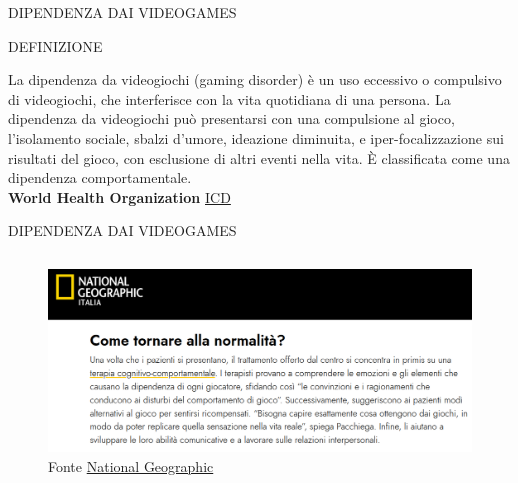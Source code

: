 \documentclass[aspectratio=1610]{beamer}
\begin{document}
\begin{frame}{DIPENDENZA DAI VIDEOGAMES}
    \begin{alertblock}{DEFINIZIONE}
        \begin{minipage}{0.98\linewidth}
            \justifying
            La dipendenza da videogiochi (gaming disorder) è un uso eccessivo o compulsivo di videogiochi, 
            che interferisce con la vita quotidiana di una persona. La dipendenza da videogiochi può presentarsi 
            con una compulsione al gioco, l'isolamento sociale, sbalzi d'umore, ideazione diminuita, 
            e iper-focalizzazione sui risultati del gioco, con esclusione di altri eventi nella vita. 
            È classificata come una dipendenza comportamentale.\\
            \bigskip
            \tiny{\textbf{World Health Organization}}
            \tiny{\href{https://icd.who.int/browse/2025-01/mms/en\#1448597234}{ICD}}
        \end{minipage}
    \end{alertblock}
\end{frame}

\begin{frame}{DIPENDENZA DAI VIDEOGAMES}
    \begin{columns}
        \column{\textwidth}
        \begin{figure}
            \includegraphics[width=\linewidth]{img/soluzione.png}
            \caption{{Fonte \href{https://www.nationalgeographic.it/dipendenza-da-videogiochi-come-uscire-dal-tunnel}{National Geographic}}}
        \end{figure}
    \end{columns}
\end{frame}
\end{document}
